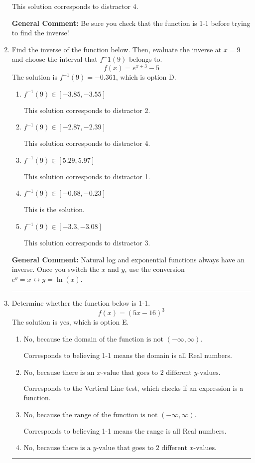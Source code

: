 \documentclass{extbook}[14pt]
\newcommand{\litem}[1]{\item #1

\rule{\textwidth}{0.4pt}}
\begin{document}
\begin{enumerate}
{\begin{enumerate}[label=\Alph*.]
 This solution corresponds to distractor 4.
\end{enumerate}

\textbf{General Comment:} Be sure you check that the function is 1-1 before trying to find the inverse!
}
\litem{
Find the inverse of the function below. Then, evaluate the inverse at $x = 9$ and choose the interval that $f^-1(9)$ belongs to.
\[ f(x) = e^{x+3}-5 \]The solution is \( f^{-1}(9) = -0.361 \), which is option D.\begin{enumerate}[label=\Alph*.]
\item \( f^{-1}(9) \in [-3.85, -3.55] \)

 This solution corresponds to distractor 2.
\item \( f^{-1}(9) \in [-2.87, -2.39] \)

 This solution corresponds to distractor 4.
\item \( f^{-1}(9) \in [5.29, 5.97] \)

 This solution corresponds to distractor 1.
\item \( f^{-1}(9) \in [-0.68, -0.23] \)

 This is the solution.
\item \( f^{-1}(9) \in [-3.3, -3.08] \)

 This solution corresponds to distractor 3.
\end{enumerate}

\textbf{General Comment:} Natural log and exponential functions always have an inverse. Once you switch the $x$ and $y$, use the conversion $ e^y = x \leftrightarrow y=\ln(x)$.
}
\litem{
Determine whether the function below is 1-1.
\[ f(x) = (5 x - 16)^3 \]The solution is \( \text{yes} \), which is option E.\begin{enumerate}[label=\Alph*.]
\item \( \text{No, because the domain of the function is not $(-\infty, \infty)$.} \)

Corresponds to believing 1-1 means the domain is all Real numbers.
\item \( \text{No, because there is an $x$-value that goes to 2 different $y$-values.} \)

Corresponds to the Vertical Line test, which checks if an expression is a function.
\item \( \text{No, because the range of the function is not $(-\infty, \infty)$.} \)

Corresponds to believing 1-1 means the range is all Real numbers.
\item \( \text{No, because there is a $y$-value that goes to 2 different $x$-values.} \)


\end{enumerate}}
\end{enumerate}
\end{document}

